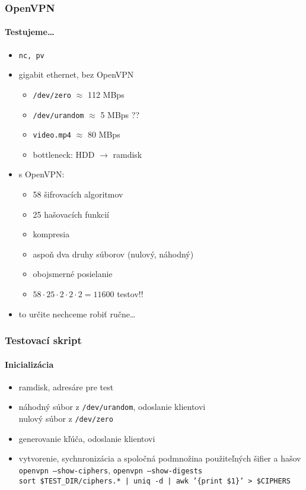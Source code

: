 \documentclass{beamer}
\begin{document}
\begin{frame}
	\frametitle{OpenVPN}
	\framesubtitle{Testujeme\dots}
	\begin{itemize}
		\item \texttt{nc, pv}
		\item gigabit ethernet, bez OpenVPN
			\begin{itemize}
				\item \texttt{/dev/zero} $\approx$ 112 MBps
				\item \texttt{/dev/urandom} $\approx$ 5 MBps ??
				\item \texttt{video.mp4} $\approx$ 80 MBps
				\item bottleneck: HDD $\rightarrow$ ramdisk
			\end{itemize}
		\bigskip
		\item s OpenVPN:
			\begin{itemize}
				\item 58 šifrovacích algoritmov
				\item 25 hašovacích funkcií
				\item kompresia
				\item aspoň dva druhy súborov (nulový, náhodný)
				\item obojsmerné posielanie
				\item $58 \cdot 25 \cdot 2 \cdot 2 \cdot 2 = 11600$ testov!!
			\end{itemize}
		\item to určite nechceme robiť ručne\dots
	\end{itemize}
\end{frame}

\begin{frame}
	\frametitle{Testovací skript}
	\framesubtitle{Inicializácia}
	\begin{itemize}
		\item ramdisk, adresáre pre test
		\item náhodný súbor z \texttt{/dev/urandom}, odoslanie klientovi\\
			 nulový súbor z \texttt{/dev/zero}
		\item generovanie kľúča, odoslanie klientovi
		\item vytvorenie, sychnronizácia a spoločná podmnožina použiteľných šifier a hašov\\
			\bigskip
			{\small
			\texttt{openvpn --show-ciphers}, \texttt{openvpn --show-digests}\\
			\texttt{sort \$TEST\_DIR/ciphers.* | uniq -d | awk '\{print \$1\}' > \$CIPHERS}}
	\end{itemize}
\end{frame}
\end{document}

